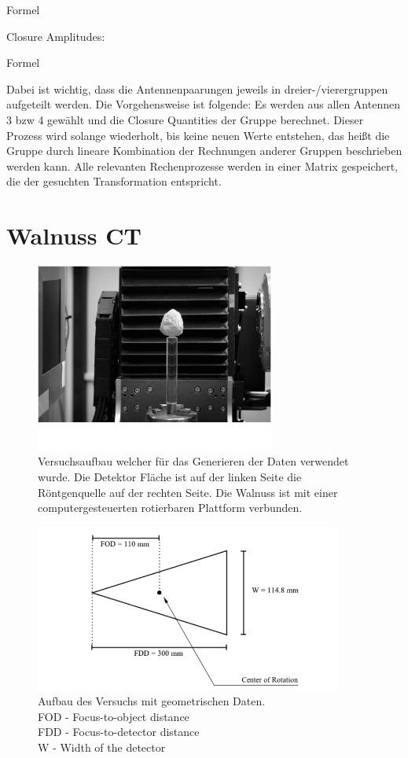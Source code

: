 \documentclass[]{dsadokumentation}
\begin{document}
Formel

Closure Amplitudes:

Formel

Dabei ist wichtig, dass die Antennenpaarungen jeweils in dreier-/vierergruppen aufgeteilt werden. Die Vorgehensweise ist folgende: Es werden aus allen Antennen 3 bzw 4 gewählt und die Closure Quantities der Gruppe berechnet. Dieser Prozess wird solange wiederholt, bis keine neuen Werte entstehen, das heißt die Gruppe durch lineare Kombination der Rechnungen anderer Gruppen beschrieben werden kann. Alle relevanten Rechenprozesse werden in einer Matrix gespeichert, die der gesuchten Transformation entspricht.

\section{Walnuss CT}\label{k4.2.ch.walnussct}

\begin{figure}
    \centering
    \includegraphics[width=0.7\textwidth]{k4.2/ctabbild.png}
    \caption{Versuchsaufbau welcher für das Generieren der Daten verwendet wurde. Die Detektor Fläche ist auf der linken Seite die Röntgenquelle auf der rechten Seite. Die Walnuss ist mit einer computergesteuerten rotierbaren Plattform verbunden.}
    \label{k4.2.fig.ctAbbild}
\end{figure}
\begin{figure}
    \centering
    \includegraphics[width=0.9\textwidth]{k4.2/geometry.png}
    \caption{Aufbau des Versuchs mit geometrischen Daten.\\
    FOD - Focus-to-object distance\\
    FDD - Focus-to-detector distance\\
    W - Width of the detector
    }
    \label{k4.2.fig.Geo}
\end{figure}
\end{document}
